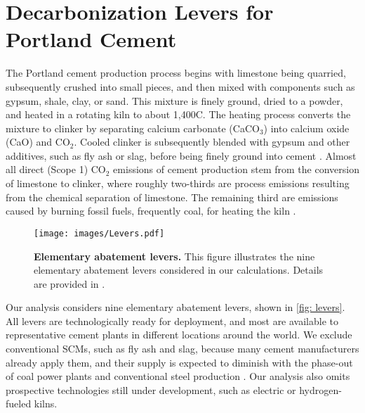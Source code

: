 \documentclass[12pt, a4paper]{article} %
\newcommand{\methods}{\nameref{sec: methods}} %
\begin{document}
\section{Decarbonization Levers for Portland Cement}
\label{sec: application}

The Portland cement production process begins with limestone being quarried, subsequently crushed into small pieces, and then mixed with components such as gypsum, shale, clay, or sand. This mixture is finely ground, dried to a powder, and heated in a rotating kiln to about 1,400\degree C. The heating process converts the mixture to clinker by separating calcium carbonate (CaCO$_3$) into calcium oxide (CaO) and CO$_2$. Cooled clinker is subsequently blended with gypsum and other additives, such as fly ash or slag, before being finely ground into cement \citep{fennell2021decarbonizing,schneider2011sustainable}. Almost all direct (Scope 1) CO$_2$ emissions of cement production stem from the conversion of limestone to clinker, where roughly two-thirds are process emissions resulting from the chemical separation of limestone. The remaining third are emissions caused by burning fossil fuels, frequently coal, for heating the kiln \citep{fennell2022going,schorcht2013best}.

\begin{figure}[ht]
\centering
\texttt{[image: images/Levers.pdf]}
\caption{\textbf{Elementary abatement levers.} This figure illustrates the nine elementary abatement levers considered in our calculations. Details are provided in \methods.}
\label{fig: levers}
\end{figure}

Our analysis considers nine elementary abatement levers, shown in \autoref{fig: levers}. All levers are technologically ready for deployment, and most are available to representative cement plants in different locations around the world. We exclude conventional SCMs, such as fly ash and slag, because many cement manufacturers already apply them, and their supply is expected to diminish with the phase-out of coal power plants and conventional steel production \citep{juenger2019supplementary}. Our analysis also omits prospective technologies still under development, such as electric or hydrogen-fueled kilns.
\end{document}
